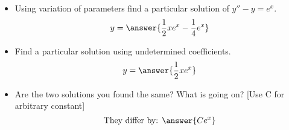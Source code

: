 \documentclass{ximera}
\begin{document}
\begin{exercise} \label{exercise:diffvarparunder}
    \begin{itemize}
        \item Using variation of parameters find a particular solution of $y''-y = e^x$.
        \[
            y = \answer{\frac{1}{2}xe^x - \frac{1}{4}e^x}
        \]
        \item Find a particular solution using undetermined coefficients.
        \[
            y = \answer{\frac{1}{2}xe^x}
        \]
        \item Are the two solutions you found the same? What is going on? [Use C for arbitrary constant]
        \[
            \text{They differ by: } \answer{Ce^x}
        \]
    \end{itemize}
\end{exercise}

\end{document}
